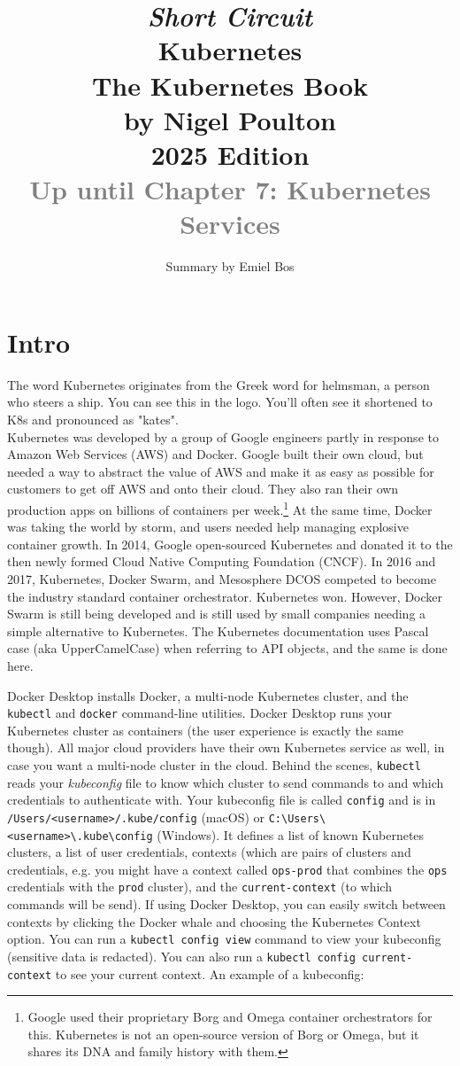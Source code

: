 \documentclass[8pt, table, xcdraw]{article}%
\title{
\textit{Short Circuit}\\
\vspace{15px}
\huge
Kubernetes\\
\vspace{20px}
\large
The Kubernetes Book\\
by Nigel Poulton\\
2025 Edition\\
\textcolor{gray}{Up until Chapter 7: Kubernetes Services}
}
\author{Summary by Emiel Bos}
\date{}
\begin{document}
\maketitle

\section{Intro}

The word Kubernetes originates from the Greek word for helmsman, a person who steers a ship. You can see this in the logo. You’ll often see it shortened to K8s and pronounced as "kates".\\
Kubernetes was developed by a group of Google engineers partly in response to Amazon Web Services (AWS) and Docker. Google built their own cloud, but needed a way to abstract the value of AWS and make it as easy as possible for customers to get off AWS and onto their cloud. They also ran their own production apps on billions of containers per week.\footnote{Google used their proprietary Borg and Omega container orchestrators for this. Kubernetes is not an open-source version of Borg or Omega, but it shares its DNA and family history with them.} At the same time, Docker was taking the world by storm, and users needed help managing explosive container growth. In 2014, Google open-sourced Kubernetes and donated it to the then newly formed Cloud Native Computing Foundation (CNCF).
In 2016 and 2017, Kubernetes, Docker Swarm, and Mesosphere DCOS competed to become the industry standard container orchestrator. Kubernetes won. However, Docker Swarm is still being developed and is still used by small companies needing a simple alternative to Kubernetes.
The Kubernetes documentation uses Pascal case (aka UpperCamelCase) when referring to API objects, and the same is done here.

Docker Desktop installs Docker, a multi-node Kubernetes cluster, and the \lstinline{kubectl} and \lstinline{docker} command-line utilities. Docker Desktop runs your Kubernetes cluster as containers (the user experience is exactly the same though). All major cloud providers have their own Kubernetes service as well, in case you want a multi-node cluster in the cloud. Behind the scenes, \lstinline{kubectl} reads your \emph{kubeconfig} file to know which cluster to send commands to and which credentials to authenticate with. Your kubeconfig file is called \lstinline{config} and is in \lstinline{/Users/<username>/.kube/config} (macOS) or \lstinline{C:\Users\<username>\.kube\config} (Windows). It defines a list of known Kubernetes clusters, a list of user credentials, contexts (which are pairs of clusters and credentials, e.g. you might have a context called \lstinline{ops-prod} that combines the \lstinline{ops} credentials with the \lstinline{prod} cluster), and the \lstinline{current-context}  (to which commands will be send). If using Docker Desktop, you can easily switch between contexts by clicking the
Docker whale and choosing the Kubernetes Context option. You can run a \lstinline{kubectl config view} command to view your kubeconfig (sensitive data is redacted). You can also run a \lstinline{kubectl config current-context} to see your current context. An example of a kubeconfig:
\end{document}
